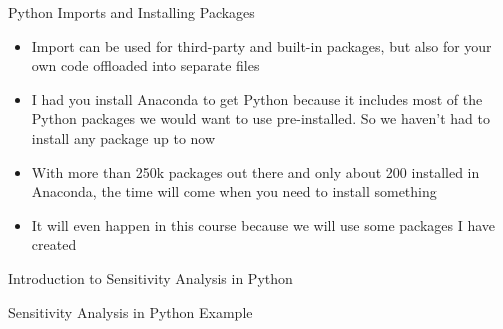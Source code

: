 \documentclass[]{article}
\begin{document}
\begin{section}{Python Imports and Installing Packages}
\begin{itemize}
\item Import can be used for third-party and built-in packages, but also for your own code offloaded into separate files
\item I had you install Anaconda to get Python because it includes most of the Python packages we would want to use pre-installed. So we haven't had to install any package up to now
\item With more than 250k packages out there and only about 200 installed in Anaconda, the time will come when you need to install something
\item It will even happen in this course because we will use some packages I have created
\end{itemize}
\end{section}
\begin{section}{Introduction to Sensitivity Analysis in Python}

\end{section}
\begin{section}{Sensitivity Analysis in Python Example}

\end{section}
\end{document}
